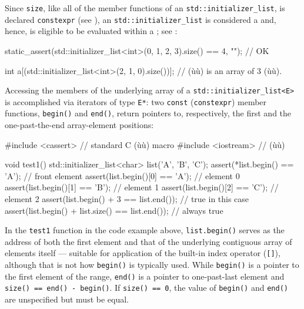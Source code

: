 Since \lstinline!size!, like all of the member functions of an
\lstinline!std::initializer_list!, is declared \lstinline!constexpr! (see ), an
\lstinline!std::initializer_list! is considered a 
and, hence, is eligible to be evaluated within a ; see : 

\begin{emcppslisting}[emcppsbatch=e3]
static_assert(std::initializer_list<int>({0, 1, 2, 3}).size() == 4, "");  // OK

int a[(std::initializer_list<int>({2, 1, 0}).size())];  // (ù{}ù) is an array of 3 (ù{}ù).
\end{emcppslisting}
    

\noindent Accessing the members of the underlying array of a
\lstinline!std::initializer_list<E>! is accomplished via iterators of type
\lstinline!E*!: two \lstinline!const! (\lstinline!constexpr!) member functions,
\lstinline!begin()! and \lstinline!end()!, return pointers to, respectively,
the first and the one-past-the-end array-element positions:

\begin{emcppslisting}[emcppsbatch=e3]
#include <cassert>   // standard C (ù{}ù) macro
#include <iostream>  // (ù{}ù)

void test1()
{
    std::initializer_list<char> list({'A', 'B', 'C'});
    assert(*list.begin()   == 'A');                    // front element
    assert(list.begin()[0] == 'A');                    // element 0
    assert(list.begin()[1] == 'B');                    // element 1
    assert(list.begin()[2] == 'C');                    // element 2
    assert(list.begin() + 3           == list.end());  // true in this case
    assert(list.begin() + list.size() == list.end());  // always true
}
\end{emcppslisting}
    

\noindent In the \lstinline!test1! function in the code example above,
\lstinline!list.begin()! serves as the address of both the first element
and that of the underlying contiguous array of elements itself ---
suitable for application of the built-in index operator (\lstinline![]!),
although that is not how \lstinline!begin()! is typically used. While
\lstinline!begin()! is a pointer to the first element of the range,
\lstinline!end()! is a pointer to one-past-last element and
\lstinline!size()!~\lstinline!==!~\lstinline!end()!~\lstinline!-!~\lstinline!begin()!.
If \lstinline!size()!~\lstinline!==!~\lstinline!0!, the value of \lstinline!begin()!
and \lstinline!end()! are unspecified but must be equal.

